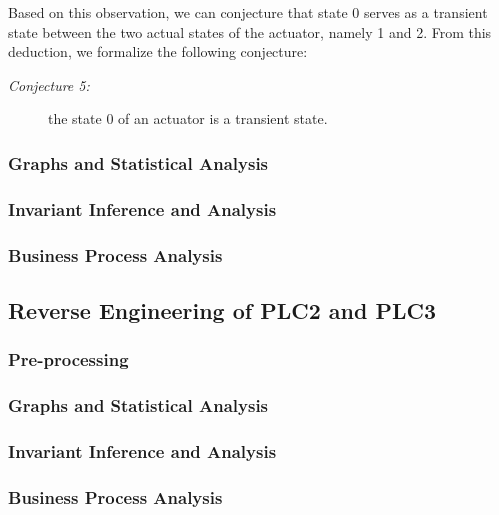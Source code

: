 Based on this observation, we can conjecture that state 0 serves as a transient state between the two actual states of the actuator, namely 1 and 2. From this deduction, we formalize the following conjecture:

\begin{description}
	\item[\colorbox{backcolourtext}{\normalfont\textit{Conjecture 5:}}] the state 0 of an actuator is a transient state.
\end{description}

\vfill

\subsubsection{Graphs and Statistical Analysis}
\label{subsubsec:6_P1P2_graphs}

\subsubsection{Invariant Inference and Analysis}
\label{subsubsec:6_P1P2_invariants}

\subsubsection{Business Process Analysis}
\label{subsubsec:6_P1P2_bpa}

\subsection{Reverse Engineering of PLC2 and PLC3}
\label{subsec:6_P2P3_analysis}

\subsubsection{Pre-processing}
\label{subsubsec:6_P2P3_preprocessing}

\subsubsection{Graphs and Statistical Analysis}
\label{subsubsec:6_P2P3_graphs}

\subsubsection{Invariant Inference and Analysis}
\label{subsubsec:6_P2P3_invariants}

\subsubsection{Business Process Analysis}
\label{subsubsec:6_P2P3_bpa}

